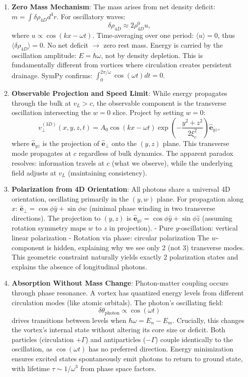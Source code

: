 \begin{enumerate}
\item \textbf{Zero Mass Mechanism}: The mass arises from net density deficit: $m = \int \delta\rho_{4D} d^4r$. For oscillatory waves:
   \[
   \delta\rho_{4D} \approx 2 \rho_{4D}^0 u,
   \]
   where $u \propto \cos(kx - \omega t)$. Time-averaging over one period: $\langle u \rangle = 0$, thus $\langle \delta\rho_{4D} \rangle = 0$. No net deficit $\to$ zero rest mass. Energy is carried by the oscillation amplitude: $E = \hbar\omega$, not by density depletion. This is fundamentally different from vortices where circulation creates persistent drainage. SymPy confirms: $\int_0^{2\pi/\omega} \cos(\omega t) dt = 0$.

\item \textbf{Observable Projection and Speed Limit}: While energy propagates through the bulk at $v_L > c$, the observable component is the transverse oscillation intersecting the $w=0$ slice. Project by setting $w=0$:
   \[
   v_\perp^{(3D)}(x,y,z,t) = A_0 \cos(kx - \omega t) \exp\left(-\frac{y^2 + z^2}{2\xi_c^2}\right) \hat{\mathbf{e}}_{yz},
   \]
   where $\hat{\mathbf{e}}_{yz}$ is the projection of $\hat{\mathbf{e}}_\perp$ onto the $(y,z)$ plane. This transverse mode propagates at $c$ regardless of bulk dynamics. The apparent paradox resolves: information travels at $c$ (what we observe), while the underlying field adjusts at $v_L$ (maintaining consistency).

\item \textbf{Polarization from 4D Orientation}: All photons share a universal 4D orientation, oscillating primarily in the $(y,w)$ plane. For propagation along $x$: $\hat{\mathbf{e}}_\perp = \cos\phi \hat{y} + \sin\phi \hat{w}$ (minimal phase winding in two transverse directions). The projection to $(y,z)$ is $\hat{\mathbf{e}}_{yz} = \cos\phi \hat{y} + \sin\phi \hat{z}$ (assuming rotation symmetry maps $w$ to $z$ in projection).
   - Pure $y$-oscillation: vertical linear polarization
   - Rotation via phase: circular polarization
   The $w$-component is hidden, explaining why we see only 2 (not 3) transverse modes. This geometric constraint naturally yields exactly 2 polarization states and explains the absence of longitudinal photons.

\item \textbf{Absorption Without Mass Change}: Photon-matter coupling occurs through phase resonance. A vortex has quantized energy levels from different circulation modes (like atomic orbitals). The photon's oscillating field:
   \[
   \delta\theta_{\text{photon}} \propto \cos(\omega t)
   \]
   drives transitions between levels when $\hbar\omega = E_n - E_m$. Crucially, this changes the vortex's internal state without altering its core size or deficit. Both particles (circulation $+\Gamma$) and antiparticles ($-\Gamma$) couple identically to the oscillation, as $\cos(\omega t)$ has no preferred direction. Energy minimization ensures excited states spontaneously emit photons to return to ground state, with lifetime $\tau \sim 1/\omega^3$ from phase space factors.


\end{enumerate}
